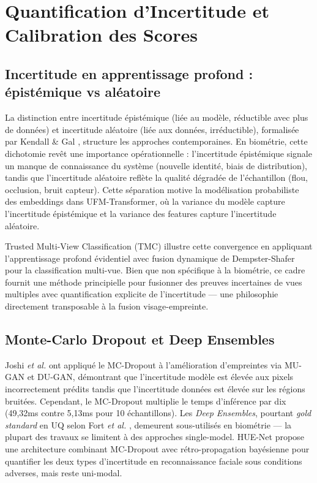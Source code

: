 \documentclass[12pt,a4paper]{report}
\begin{document}
\section{Quantification d'Incertitude et Calibration des Scores}
\label{sec:incertitude}

\subsection{Incertitude en apprentissage profond : \'{e}pist\'{e}mique vs al\'{e}atoire}

La distinction entre incertitude \'{e}pist\'{e}mique (li\'{e}e au mod\`{e}le, r\'{e}ductible avec plus de donn\'{e}es) et incertitude al\'{e}atoire (li\'{e}e aux donn\'{e}es, irr\'{e}ductible), formalis\'{e}e par Kendall \& Gal \cite{kendall2017uncertainties}, structure les approches contemporaines. En biom\'{e}trie, cette dichotomie rev\^{e}t une importance op\'{e}rationnelle : l'incertitude \'{e}pist\'{e}mique signale un manque de connaissance du syst\`{e}me (nouvelle identit\'{e}, biais de distribution), tandis que l'incertitude al\'{e}atoire refl\`{e}te la qualit\'{e} d\'{e}grad\'{e}e de l'\'{e}chantillon (flou, occlusion, bruit capteur). Cette s\'{e}paration motive la mod\'{e}lisation probabiliste des embeddings dans UFM-Transformer, o\`{u} la variance du mod\`{e}le capture l'incertitude \'{e}pist\'{e}mique et la variance des features capture l'incertitude al\'{e}atoire.

Trusted Multi-View Classification (TMC) \cite{han2022trusted} illustre cette convergence en appliquant l'apprentissage profond \'{e}videntiel avec fusion dynamique de Dempster-Shafer pour la classification multi-vue. Bien que non sp\'{e}cifique \`{a} la biom\'{e}trie, ce cadre fournit une m\'{e}thode principielle pour fusionner des preuves incertaines de vues multiples avec quantification explicite de l'incertitude --- une philosophie directement transposable \`{a} la fusion visage-empreinte.

\subsection{Monte-Carlo Dropout et Deep Ensembles}

Joshi \textit{et al.} \cite{joshi2022estimating} ont appliqu\'{e} le MC-Dropout \`{a} l'am\'{e}lioration d'empreintes via MU-GAN et DU-GAN, d\'{e}montrant que l'incertitude mod\`{e}le est \'{e}lev\'{e}e aux pixels incorrectement pr\'{e}dits tandis que l'incertitude donn\'{e}es est \'{e}lev\'{e}e sur les r\'{e}gions bruit\'{e}es. Cependant, le MC-Dropout multiplie le temps d'inf\'{e}rence par dix (49,32ms contre 5,13ms pour 10 \'{e}chantillons). Les \textit{Deep Ensembles}, pourtant \textit{gold standard} en UQ selon Fort \textit{et al.} \cite{fort2019deep}, demeurent sous-utilis\'{e}s en biom\'{e}trie --- la plupart des travaux se limitent \`{a} des approches single-model. HUE-Net \cite{huenet2025human} propose une architecture combinant MC-Dropout avec r\'{e}tro-propagation bay\'{e}sienne pour quantifier les deux types d'incertitude en reconnaissance faciale sous conditions adverses, mais reste uni-modal.
\end{document}
